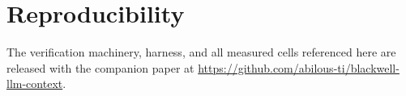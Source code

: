\documentclass[11pt]{article}
\theoremstyle{plain}
\theoremstyle{definition}
\theoremstyle{remark}
\begin{document}
\section*{Reproducibility}
The verification machinery, harness, and all measured cells referenced here are released with the
companion paper at \url{https://github.com/abilous-ti/blackwell-llm-context}.



\end{document}
